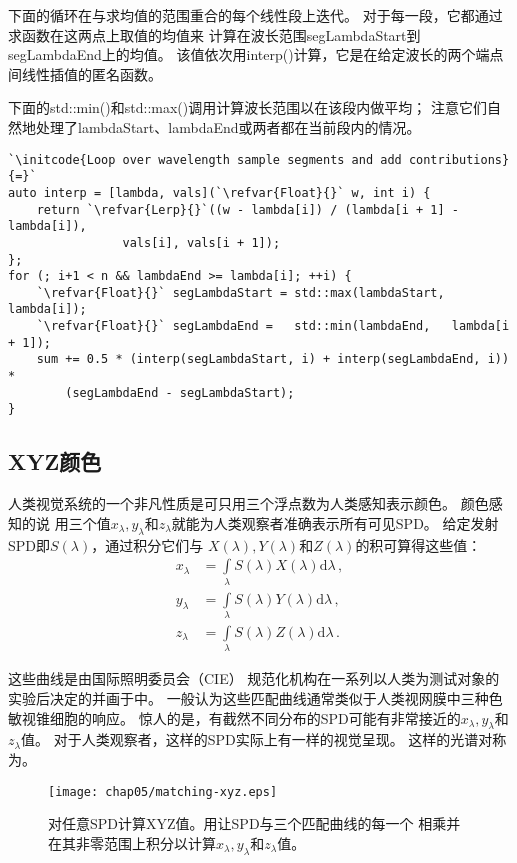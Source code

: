 下面的循环在与求均值的范围重合的每个线性段上迭代。
对于每一段，它都通过求函数在这两点上取值的均值来
计算在波长范围{\ttfamily segLambdaStart}到{\ttfamily segLambdaEnd}上的均值。
该值依次用{\ttfamily interp()}计算，它是在给定波长的两个端点间线性插值的匿名函数。

下面的{\ttfamily std::min()}和{\ttfamily std::max()}调用计算波长范围以在该段内做平均；
注意它们自然地处理了{\ttfamily lambdaStart}、{\ttfamily lambdaEnd}或两者都在当前段内的情况。
\begin{lstlisting}
`\initcode{Loop over wavelength sample segments and add contributions}{=}`
auto interp = [lambda, vals](`\refvar{Float}{}` w, int i) {
    return `\refvar{Lerp}{}`((w - lambda[i]) / (lambda[i + 1] - lambda[i]),
                vals[i], vals[i + 1]);
};
for (; i+1 < n && lambdaEnd >= lambda[i]; ++i) {
    `\refvar{Float}{}` segLambdaStart = std::max(lambdaStart, lambda[i]);
    `\refvar{Float}{}` segLambdaEnd =   std::min(lambdaEnd,   lambda[i + 1]);
    sum += 0.5 * (interp(segLambdaStart, i) + interp(segLambdaEnd, i)) *
        (segLambdaEnd - segLambdaStart);
}
\end{lstlisting}

\subsection{XYZ颜色}\label{sub:XYZ颜色}
人类视觉系统的一个非凡性质是可只用三个浮点数为人类感知表示颜色。
颜色感知的说
用三个值$x_{\lambda},y_{\lambda}$和$z_{\lambda}$就能为人类观察者准确表示所有可见SPD。
给定发射SPD即$S(\lambda)$，通过积分它们与
$X(\lambda),Y(\lambda)$和$Z(\lambda)$的积可算得这些值：
\begin{align}\label{eq:5.1}
    x_{\lambda} & =\int\limits_{\lambda}{S(\lambda)X(\lambda)\mathrm{d}\lambda}\, ,\nonumber \\
    y_{\lambda} & =\int\limits_{\lambda}{S(\lambda)Y(\lambda)\mathrm{d}\lambda}\, ,          \\
    z_{\lambda} & =\int\limits_{\lambda}{S(\lambda)Z(\lambda)\mathrm{d}\lambda}\, .\nonumber
\end{align}

这些曲线是由国际照明委员会（CIE）
规范化机构在一系列以人类为测试对象的实验后决定的并画于中。
一般认为这些匹配曲线通常类似于人类视网膜中三种色敏视锥细胞的响应。
惊人的是，有截然不同分布的SPD可能有非常接近的$x_{\lambda},y_{\lambda}$和$z_{\lambda}$值。
对于人类观察者，这样的SPD实际上有一样的视觉呈现。
这样的光谱对称为。
\begin{figure}[htbp]
    \centering\texttt{[image: chap05/matching-xyz.eps]}
    \caption{对任意SPD计算XYZ值。用让SPD与三个匹配曲线的每一个
    相乘并在其非零范围上积分以计算$x_{\lambda},y_{\lambda}$和$z_{\lambda}$值。}
    \label{fig:5.3}
\end{figure}

